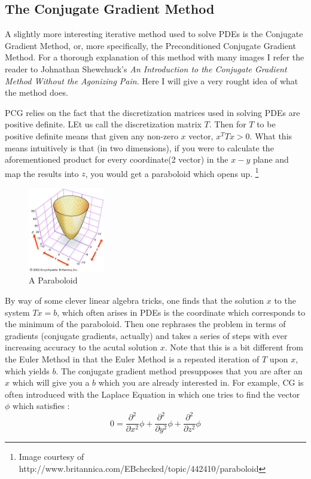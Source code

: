 \documentclass[a4paper]{article}
\begin{document}
\subsection{The Conjugate Gradient Method}
A slightly more interesting iterative method used to solve PDEs is the Conjugate Gradient Method, or, more specifically, the Preconditioned Conjugate Gradient Method. For a thorough explanation of this method with many images I refer the reader to Johnathan Shewchuck's \emph{An Introduction to the Conjugate Gradient Method Without the Agonizing Pain}. Here I will give a very rought idea of what the method does. 

PCG relies on the fact that the discretization matrices used in solving PDEs are positive definite. LEt us call the discretization matrix $T$. Then for $T$ to be positive definite means that given any non-zero $x$ vector, $x^{T}Tx> 0$. What this means intuitively is that (in two dimensions), if you were to calculate the aforementioned product for every coordinate(2 vector) in the $x-y$ plane and map the results into $z$, you would get a paraboloid which opens up. \footnote{Image courtesy of http://www.britannica.com/EBchecked/topic/442410/paraboloid}

\begin{figure}

  \begin{center}
    \includegraphics[width=0.3\textwidth]{paraboloid.jpg}
  \end{center}
  \caption{A Paraboloid}
\end{figure}


By way of some clever linear algebra tricks, one finds that the solution $x$ to the system $Tx=b$, which often arises in PDEs is the coordinate which corresponds to the minimum of the paraboloid. Then one rephrases the problem in terms of gradients (conjugate gradients, actually) and takes a series of steps with ever increasing accuracy to the acutal solution $x$. Note that this is a bit different from the Euler Method in that the Euler Method is a repeated iteration of $T$ upon $x$, which yields $b$. The conjugate gradient method presupposes that you are after an $x$ which will give you a $b$ which you are already interested in. For example, CG is often introduced with the Laplace Equation in which one tries to find the vector $\phi$ which satisfies :
\begin{equation}
0 = \frac{\partial^2}{\partial x^2}\phi + \frac{\partial^2}{\partial y^2}\phi + \frac{\partial^2}{\partial z^2}\phi
\end{equation}
\end{document}
